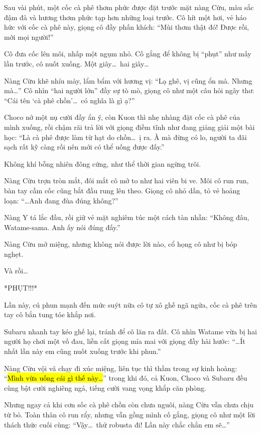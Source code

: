 \documentclass[../main.tex]{subfiles}
\begin{document}
Sau vài phút, một cốc cà phê thơm phức được đặt trước mặt nàng Cừu, màu sắc đậm đà và hương thơm phức tạp hơn những loại trước. Cô hít một hơi, vẻ háo hức với cốc cà phê này, giọng cô đầy phấn khích: ``Mùi thơm thật đó! Được rồi, mời mọi người!''

Cô đưa cốc lên môi, nhấp một ngụm nhỏ. Cố gắng để không bị ``phụt'' như mấy lần trước, cô nuốt xuống. Một giây\dots\ hai giây\dots

Nàng Cừu khẽ nhíu mày, lẩm bẩm với hương vị: ``Lạ ghê, vị cũng ổn mà. Nhưng mà\dots'' Cô nhìn ``hai người lớn'' đầy sự tò mò, giọng cô như một câu hỏi ngây thơ: ``Cái tên `cà phê chồn'\dots\ có nghĩa là gì ạ?''

Choco nở một nụ cười đầy ẩn ý, còn Kuon thì nhẹ nhàng đặt cốc cà phê của mình xuống, rồi chậm rãi trả lời với giọng điềm tĩnh như đang giảng giải một bài học: ``Là cà phê được làm từ hạt do chồn\dots\ ị ra. À mà đừng có lo, người ta đãi sạch rất kỹ càng rồi nên mới có thể uống được đấy.''

Không khí bỗng nhiên đông cứng, như thể thời gian ngừng trôi.

Nàng Cừu trợn tròn mắt, đôi mắt cô mở to như hai viên bi ve. Môi cô run run, bàn tay cầm cốc cũng bắt đầu rung lên theo. Giọng cô nhỏ dần, tỏ vẻ hoảng loạn: ``\dots Anh đang đùa đúng không?''

Nàng Y tá lắc đầu, rồi giữ vẻ mặt nghiêm túc một cách tàn nhẫn: ``Không đâu, Watame-sama. Anh ấy nói đúng đấy.''

Nàng Cừu mở miệng, nhưng không nói được lời nào, cổ họng cô như bị bóp nghẹt.

Và rồi\dots

*PHỤT!!!*

Lần này, cú phun mạnh đến mức suýt nữa cô tự xô ghế ngã ngửa, cốc cà phê trên tay cô bắn tung tóe khắp nơi.

Subaru nhanh tay kéo ghế lại, tránh để cô lăn ra đất. Cô nhìn Watame vừa bị hai người họ chơi một vố đau, liền cất giọng mỉa mai với giọng đầy hài hước: ``\dots Ít nhất lần này em cũng nuốt xuống trước khi phun.''

Nàng Cừu vội vã chạy đi xúc miệng, liên tục thì thầm trong sự kinh hoàng: ``\hl{Mình vừa uống cái gì thế này\dots}'' trong khi đó, cả Kuon, Choco và Subaru đều cùng bật cười nghiêng ngả, tiếng cười vang vọng khắp căn phòng.

Nhưng ngay cả khi cơn sốc cà phê chồn còn chưa nguôi, nàng Cừu vẫn chưa chịu từ bỏ. Toàn thân cô run rẩy, nhưng vẫn gồng mình cố gắng, giọng cô như một lời thách thức cuối cùng: ``Vậy\dots\ thử robusta đi! Lần này chắc chắn em sẽ\dots''
\end{document}
